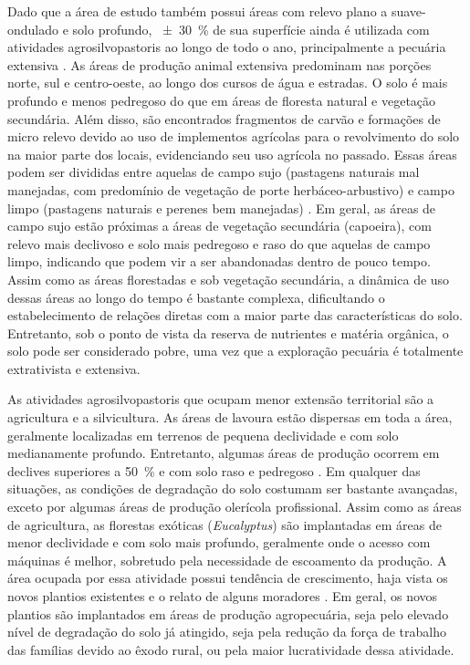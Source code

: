 Dado que a área de estudo também possui áreas com relevo plano a suave-ondulado e solo profundo, 
\SI{\pm30}{\percent} de sua superfície ainda é utilizada com atividades agrosilvopastoris ao longo de todo o 
ano, principalmente a pecuária extensiva \cite{SamuelRosaEtAl2011a}. As áreas de produção animal extensiva 
predominam nas porções norte, sul e centro-oeste, ao longo dos cursos de água e estradas. O solo é mais 
profundo e menos pedregoso do que em áreas de floresta natural e vegetação secundária. Além disso, são 
encontrados fragmentos de carvão e formações de micro relevo devido ao uso de implementos agrícolas para o 
revolvimento do solo na maior parte dos locais, evidenciando seu uso agrícola no passado. Essas áreas podem 
ser divididas entre aquelas de campo sujo (pastagens naturais mal manejadas, com predomínio de vegetação de 
porte herbáceo-arbustivo) e campo limpo (pastagens naturais e perenes bem manejadas) 
\cite{SamuelRosaEtAl2011a}. Em geral, as áreas de campo sujo estão próximas a áreas de vegetação secundária 
(capoeira), com relevo mais declivoso e solo mais pedregoso e raso do que aquelas de campo limpo, indicando que 
podem vir a ser abandonadas dentro de pouco tempo. Assim como as áreas florestadas e sob vegetação secundária, 
a dinâmica de uso dessas áreas ao longo do tempo é bastante complexa, dificultando o estabelecimento de 
relações diretas com a maior parte das características do solo. Entretanto, sob o ponto de vista da reserva de 
nutrientes e matéria orgânica, o solo pode ser considerado pobre, uma vez que a exploração pecuária é 
totalmente extrativista e extensiva.


As atividades agrosilvopastoris que ocupam menor extensão territorial são a agricultura e a silvicultura. As 
áreas de lavoura estão dispersas em toda a área, geralmente localizadas em terrenos de pequena declividade e 
com solo medianamente profundo. Entretanto, algumas áreas de produção ocorrem em declives superiores a 
\SI{50}{\percent} e com solo raso e pedregoso \cite{SamuelRosaEtAl2011a}. Em qualquer das situações, as 
condições de degradação do solo costumam ser bastante avançadas, exceto por algumas áreas de produção 
olerícola profissional. Assim como as áreas de agricultura, as florestas exóticas (\textit{Eucalyptus}) são 
implantadas em áreas de menor declividade e com solo mais profundo, geralmente onde o acesso com máquinas é 
melhor, sobretudo pela necessidade de escoamento da produção. A área ocupada por essa atividade possui 
tendência de crescimento, haja vista os novos plantios existentes e o relato de alguns moradores 
\cite{SamuelRosaEtAl2011a}. Em geral, os novos plantios são implantados em áreas de produção agropecuária, seja 
pelo elevado nível de degradação do solo já atingido, seja pela redução da força de trabalho das famílias 
devido ao êxodo rural, ou pela maior lucratividade dessa atividade.

